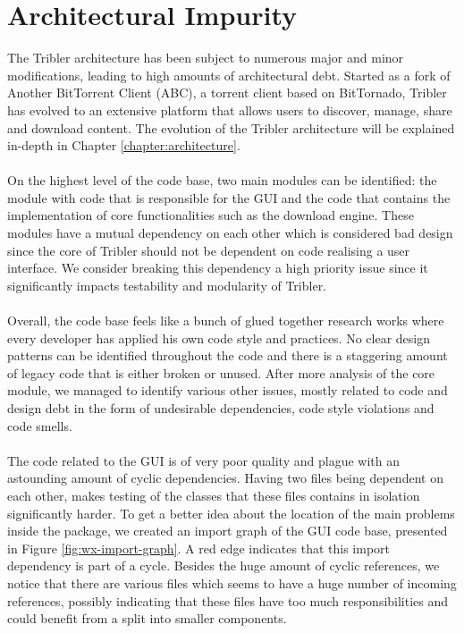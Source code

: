 \section{Architectural Impurity}
The Tribler architecture has been subject to numerous major and minor modifications, leading to high amounts of architectural debt. Started as a fork of Another BitTorrent Client (ABC), a torrent client based on BitTornado, Tribler has evolved to an extensive platform that allows users to discover, manage, share and download content. The evolution of the Tribler architecture will be explained in-depth in Chapter \ref{chapter:architecture}.\\\\
On the highest level of the code base, two main modules can be identified: the module with code that is responsible for the GUI and the code that contains the implementation of core functionalities such as the download engine. These modules have a mutual dependency on each other which is considered bad design since the core of Tribler should not be dependent on code realising a user interface. We consider breaking this dependency a high priority issue since it significantly impacts testability and modularity of Tribler.\\\\
Overall, the code base feels like a bunch of glued together research works where every developer has applied his own code style and practices. No clear design patterns can be identified throughout the code and there is a staggering amount of legacy code that is either broken or unused. After more analysis of the core module, we managed to identify various other issues, mostly related to code and design debt in the form of undesirable dependencies, code style violations and code smells.\\\\
The code related to the GUI is of very poor quality and plague with an astounding amount of cyclic dependencies. Having two files being dependent on each other, makes testing of the classes that these files contains in isolation significantly harder. To get a better idea about the location of the main problems inside the package, we created an import graph of the GUI code base, presented in Figure \ref{fig:wx-import-graph}. A red edge indicates that this import dependency is part of a cycle. Besides the huge amount of cyclic references, we notice that there are various files which seems to have a huge number of incoming references, possibly indicating that these files have too much responsibilities and could benefit from a split into smaller components.\\

